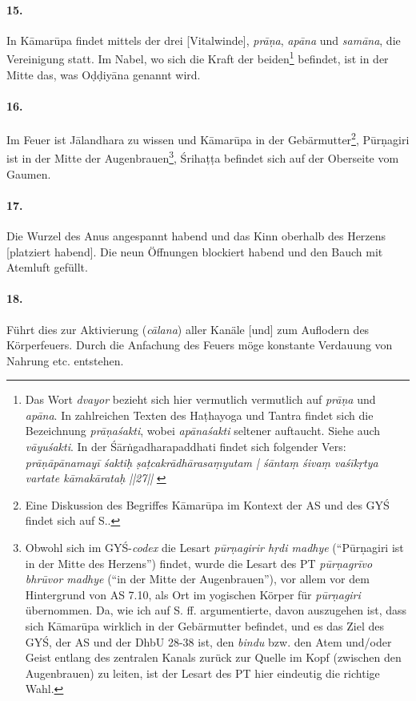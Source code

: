 \documentclass[a4paper,12pt]{article}
\begin{document}
\paragraph{15.} In Kāmarūpa findet mittels der drei [Vitalwinde], \textit{prāṇa}, \textit{apāna} und \textit{samāna}, die Vereinigung statt. 
Im Nabel, wo sich die Kraft der beiden\footnote{Das Wort \textit{dvayor} bezieht sich hier vermutlich vermutlich auf \textit{prāṇa} und \textit{apāna}. In zahlreichen Texten des Haṭhayoga und Tantra findet sich die Bezeichnung \textit{prāṇaśakti}, wobei \textit{apānaśakti} seltener auftaucht. Siehe auch \textit{vāyuśakti}. In der Śārṅgadharapaddhati findet sich folgender Vers: \textit{prāṇāpānamayī śaktiḥ ṣaṭcakrādhārasaṃyutam | śāntaṃ śivaṃ vaśīkṛtya vartate kāmakārataḥ ||27||} \parencite[654]{peterson1888}} befindet, ist in der Mitte das, was Oḍḍiyāna genannt wird.

\paragraph{16.} Im Feuer ist Jālandhara zu wissen und Kāmarūpa in der Gebärmutter\footnote{Eine Diskussion des Begriffes Kāmarūpa im Kontext der AS und des GYŚ findet sich auf S.\pageref{kamarupa}.}, Pūrṇagiri ist in der Mitte der Augenbrauen\footnote{Obwohl sich im GYŚ-\textit{codex} die Lesart \textit{pūrṇagirir hṛdi madhye} (``Pūrṇagiri ist in der Mitte des Herzens'') findet, wurde die Lesart des PT \textit{pūrṇagrīvo bhrūvor madhye} (``in der Mitte der Augenbrauen''), vor allem vor dem Hintergrund von AS 7.10, als Ort im yogischen Körper für \textit{pūrṇagiri} übernommen. Da, wie ich auf S. \pageref{kamarupa} ff. argumentierte, davon auszugehen ist, dass sich Kāmarūpa wirklich in der Gebärmutter befindet, und es das Ziel des GYŚ, der AS und der DhbU 28-38 ist, den \textit{bindu} bzw. den Atem und/oder Geist entlang des zentralen Kanals zurück zur Quelle im Kopf (zwischen den Augenbrauen) zu leiten, ist der Lesart des PT hier eindeutig die richtige Wahl.}, Śrihaṭṭa befindet sich auf der Oberseite vom Gaumen. 

\paragraph{17.} Die Wurzel des Anus angespannt habend und das Kinn oberhalb des Herzens [platziert habend]. Die neun Öffnungen blockiert habend und den Bauch mit Atemluft gefüllt.

\paragraph{18.} Führt dies zur Aktivierung (\textit{cālana}) aller Kanäle [und] zum Auflodern des Körperfeuers. Durch die Anfachung des Feuers möge konstante Verdauung von Nahrung etc. entstehen.
\end{document}
